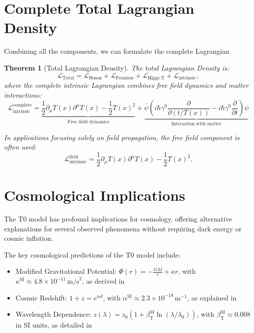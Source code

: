 \documentclass[12pt,a4paper]{article}
\newcommand{\Tfield}{T(x)}
\newcommand{\betaT}{\beta_{\text{T}}}
\newtheorem{theorem}{Theorem}[section]
\theoremstyle{definition}
\theoremstyle{remark}
\begin{document}
	\section{Complete Total Lagrangian Density}
	Combining all the components, we can formulate the complete Lagrangian 
\begin{theorem}[Total Lagrangian Density]
	The total Lagrangian Density is:
	\begin{equation}
		\mathcal{L}_{\text{Total}} = \mathcal{L}_{\text{Boson}} + \mathcal{L}_{\text{Fermion}} + \mathcal{L}_{\text{Higgs-T}} + \mathcal{L}_{\text{intrinsic}},
	\end{equation}
	where the complete intrinsic Lagrangian combines free field dynamics and matter interactions:
	\begin{equation}
		\mathcal{L}_{\text{intrinsic}}^{\text{complete}} = \underbrace{\frac{1}{2} \partial_\mu \Tfield \partial^\mu \Tfield - \frac{1}{2}\Tfield^2}_{\text{Free field dynamics}} + \underbrace{\bar{\psi} \left( i\hbar \gamma^0 \frac{\partial}{\partial (t/\Tfield)} - i\hbar \gamma^0 \frac{\partial}{\partial t} \right) \psi}_{\text{Interaction with matter}}
	\end{equation}
	
	In applications focusing solely on field propagation, the free field component is often used:
	\begin{equation}
		\mathcal{L}_{\text{intrinsic}}^{\text{field}} = \frac{1}{2} \partial_\mu \Tfield \partial^\mu \Tfield - \frac{1}{2} \Tfield^2.
	\end{equation}
\end{theorem}
	\section{Cosmological Implications}
	The T0 model has profound implications for cosmology, offering alternative explanations for several observed phenomena without requiring dark energy or cosmic inflation.
	
	The key cosmological predictions of the T0 model include:
	\begin{itemize}
		\item Modified Gravitational Potential: \( \Phi(r) = -\frac{GM}{r} + \kappa r \), with \( \kappa^{\text{SI}} \approx 4.8 \times 10^{-11} \, \text{m/s}^2 \), as derived in \cite{pascher_emergente_gravitation_2025}
		\item Cosmic Redshift: \( 1 + z = e^{\alpha d} \), with \( \alpha^{\text{SI}} \approx 2.3 \times 10^{-18} \, \text{m}^{-1} \), as explained in \cite{pascher_galaxies_2025}
		\item Wavelength Dependence: \( z(\lambda) = z_0 (1 + \betaT^{\text{SI}} \ln(\lambda/\lambda_0)) \), with \( \betaT^{\text{SI}} \approx 0.008 \) in SI units, as detailed in \cite{pascher_messdifferenzen_2025}
	\end{itemize}
	
\end{document}
